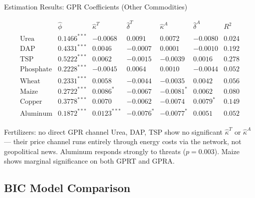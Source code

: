 ﻿\documentclass[aspectratio=1610]{beamer}
\begin{document}
\begin{frame}[shrink=10]{Estimation Results: GPR Coefficients (Other Commodities)}

  {\small
  \[
    \begin{array}{lcccccc}
       & \hat{\phi} & \hat{\kappa}^T & \hat{\delta}^T & \hat{\kappa}^A & \hat{\delta}^A & R^2 \\
      \text{Urea}      & 0.1466^{***} & -0.0068        &  0.0091        &  0.0072        & -0.0080        & 0.024 \\
      \text{DAP}       & 0.4331^{***} &  0.0046        & -0.0007        &  0.0001        & -0.0010        & 0.192 \\
      \text{TSP}       & 0.5222^{***} &  0.0062        & -0.0015        & -0.0039        &  0.0016        & 0.278 \\
      \text{Phosphate} & 0.2228^{***} & -0.0045        &  0.0064        &  0.0010        & -0.0044        & 0.052 \\
      \text{Wheat}     & 0.2331^{***} &  0.0058        & -0.0044        & -0.0035        &  0.0042        & 0.056 \\
      \text{Maize}     & 0.2722^{***} &  0.0086^{*}    & -0.0067        & -0.0081^{*}    &  0.0062        & 0.080 \\
      \text{Copper}    & 0.3778^{***} &  0.0070        & -0.0062        & -0.0074        &  0.0079^{*}    & 0.149 \\
      \text{Aluminum}  & 0.1872^{***} &  0.0123^{***}  & -0.0076^{*}    & -0.0077^{*}    &  0.0051        & 0.052 \\
    \end{array}
  \]
  }

  \begin{alertblock}{Fertilizers: no direct GPR channel}
    Urea, DAP, TSP show no significant $\hat{\kappa}^T$ or $\hat{\kappa}^A$ ---
    their price channel runs entirely through energy costs via the network, not
    geopolitical news. Aluminum responds strongly to threats ($p = 0.003$).
    Maize shows marginal significance on both GPRT and GPRA.
  \end{alertblock}

\end{frame}

\subsection{BIC Model Comparison}
\end{document}
